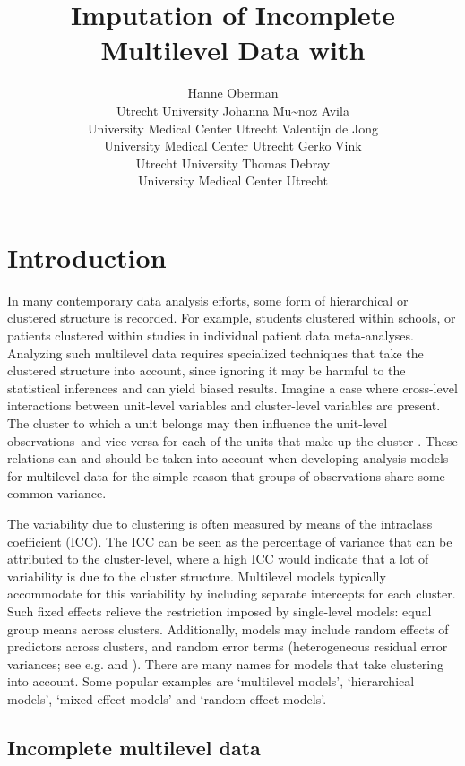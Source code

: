 \documentclass[
]{jss}
\author{
Hanne Oberman\\Utrecht University \And Johanna Mu\textasciitilde noz
Avila\\University Medical Center Utrecht \AND Valentijn de
Jong\\University Medical Center Utrecht \And Gerko Vink\\Utrecht
University \AND Thomas Debray\\University Medical Center Utrecht
}
\title{Imputation of Incomplete Multilevel Data with \pkg{mice}}
\begin{document}
\hypertarget{introduction}{%
\section{Introduction}\label{introduction}}

In many contemporary data analysis efforts, some form of hierarchical or
clustered structure is recorded. For example, students clustered within
schools, or patients clustered within studies in individual patient data
meta-analyses. Analyzing such multilevel data requires specialized
techniques that take the clustered structure into account, since
ignoring it may be harmful to the statistical inferences and can yield
biased results. Imagine a case where cross-level interactions between
unit-level variables and cluster-level variables are present. The
cluster to which a unit belongs may then influence the unit-level
observations--and vice versa for each of the units that make up the
cluster \citep{hox17}. These relations can and should be taken into
account when developing analysis models for multilevel data for the
simple reason that groups of observations share some common variance.

The variability due to clustering is often measured by means of the
intraclass coefficient (ICC). The ICC can be seen as the percentage of
variance that can be attributed to the cluster-level, where a high ICC
would indicate that a lot of variability is due to the cluster
structure. Multilevel models typically accommodate for this variability
by including separate intercepts for each cluster. Such fixed effects
relieve the restriction imposed by single-level models: equal group
means across clusters. Additionally, models may include random effects
of predictors across clusters, and random error terms (heterogeneous
residual error variances; see e.g. \citet{hox17} and \citet{jong21}).
There are many names for models that take clustering into account. Some
popular examples are `multilevel models', `hierarchical models', `mixed
effect models' and `random effect models'.

\hypertarget{incomplete-multilevel-data}{%
\subsection{Incomplete multilevel
data}\label{incomplete-multilevel-data}}
\end{document}
